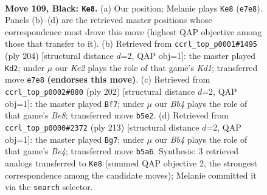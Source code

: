 \documentclass[11pt]{article}
\begin{document}
\clearpage

\begin{figure}[p]\centering
\begin{subfigure}{0.46\textwidth}\centering
\resizebox{\linewidth}{!}{%
\newchessgame
\chessboard[
  setfen={6K1/4k3/8/1b3p2/5P2/8/8/8 b - - 33 109},
  showmover=false,
  pgfstyle=straightmove, color=movearrow, markmove={e7-e8}
]}
\caption{}
\end{subfigure}\hfill
\begin{subfigure}{0.46\textwidth}\centering
\resizebox{\linewidth}{!}{%
\newchessgame
\chessboard[
  setfen={4k3/8/8/4p3/8/5P2/B4b2/3K4 w - - 27 103},
  showmover=false,
  pgfstyle=straightmove, color=movearrow, markmove={d1-d2}
]}
\caption{}
\end{subfigure}
\\[4pt]
\begin{subfigure}{0.46\textwidth}\centering
\resizebox{\linewidth}{!}{%
\newchessgame
\chessboard[
  setfen={4B1n1/8/3p4/3P4/1k6/8/2K5/8 w - - 17 102},
  showmover=false,
  pgfstyle=straightmove, color=movearrow, markmove={e8-f7}
]}
\caption{}
\end{subfigure}\hfill
\begin{subfigure}{0.46\textwidth}\centering
\resizebox{\linewidth}{!}{%
\newchessgame
\chessboard[
  setfen={8/8/k7/4b3/2K5/p7/P7/6N1 b - - 71 107},
  showmover=false,
  pgfstyle=straightmove, color=movearrow, markmove={e5-g7}
]}
\caption{}
\end{subfigure}
\caption{\textbf{Move 109, Black: \texttt{Ke8}.} (a) Our position; Melanie plays \texttt{Ke8} (\texttt{e7e8}). Panels (b)--(d) are the retrieved master positions whose correspondence most drove this move (highest QAP objective among those that transfer to it). (b) Retrieved from \texttt{ccrl\_top\_p0001\#1495} (ply 204) [structural distance $d$=2, QAP obj=1]: the master played \texttt{Kd2}; under $\mu$ our \emph{Ke2} plays the role of that game's \emph{Kd1}; transferred move \texttt{e7e8} \textbf{(endorses this move)}. (c) Retrieved from \texttt{ccrl\_top\_p0002\#880} (ply 202) [structural distance $d$=2, QAP obj=1]: the master played \texttt{Bf7}; under $\mu$ our \emph{Bb4} plays the role of that game's \emph{Be8}; transferred move \texttt{b5e2}. (d) Retrieved from \texttt{ccrl\_top\_p0000\#2372} (ply 213) [structural distance $d$=2, QAP obj=1]: the master played \texttt{Bg7}; under $\mu$ our \emph{Bb4} plays the role of that game's \emph{Be4}; transferred move \texttt{b5a6}. Synthesis: 3 retrieved analogs transferred to \texttt{Ke8} (summed QAP objective 2, the strongest correspondence among the candidate moves); Melanie committed it via the \texttt{search} selector.}
\label{fig:thought-m217}
\end{figure}
\end{document}
